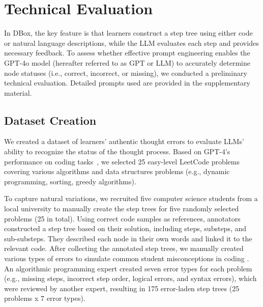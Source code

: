 
\section{Technical Evaluation}
\label{techeval}






In DBox, the key feature is that learners construct a step tree using either code or natural language descriptions, while the LLM evaluates each step and provides necessary feedback. To assess whether effective prompt engineering enables the GPT-4o model (hereafter referred to as GPT or LLM) to accurately determine node statuses (i.e., correct, incorrect, or missing), we conducted a preliminary technical evaluation. Detailed prompts used are provided in the supplementary material.






\subsection{Dataset Creation} 
We created a dataset of learners' authentic thought errors to evaluate LLMs' ability to recognize the status of the thought process.
Based on GPT-4's performance on coding tasks~\cite{finnie2023my, savelka2023thrilled}, we selected 25 easy-level LeetCode problems covering various algorithms and data structures problems (e.g., dynamic programming, sorting, greedy algorithms).

To capture natural variations, we recruited five computer science students from a local university to manually create the step trees for five randomly selected problems (25 in total). 
Using correct code samples as references, annotators constructed a step tree based on their solution, including steps, substeps, and sub-substeps. 
They described each node in their own words and linked it to the relevant code.
After collecting the annotated step trees, we manually created various types of errors to simulate common student misconceptions in coding \cite{qian2017students}.
An algorithmic programming expert created seven error types for each problem (e.g., missing steps, incorrect step order, logical errors, and syntax errors), which were reviewed by another expert, resulting in 175 error-laden step trees (25 problems x 7 error types).

